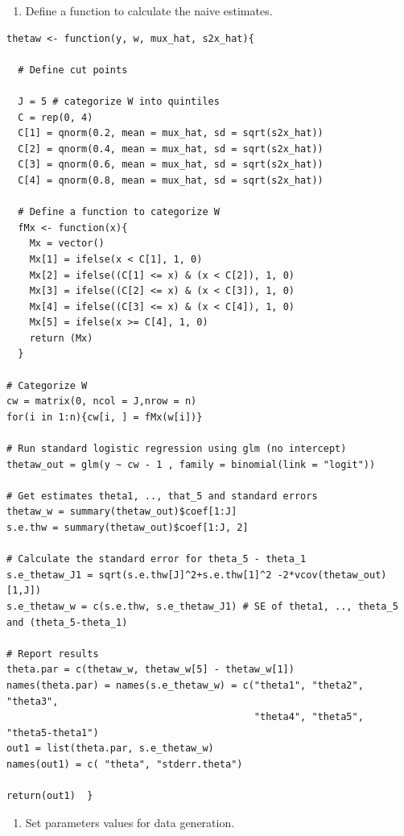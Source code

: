 \documentclass[15 pt,]{article}
\providecommand{\tightlist}{%
  \setlength{\itemsep}{0pt}\setlength{\parskip}{0pt}}
\begin{document}
\begin{enumerate}
\def\labelenumi{(\arabic{enumi})}
\tightlist
\item
  Define a function to calculate the naive estimates.
\end{enumerate}

\begin{verbatim}
thetaw <- function(y, w, mux_hat, s2x_hat){
  
  # Define cut points
  
  J = 5 # categorize W into quintiles
  C = rep(0, 4)
  C[1] = qnorm(0.2, mean = mux_hat, sd = sqrt(s2x_hat))
  C[2] = qnorm(0.4, mean = mux_hat, sd = sqrt(s2x_hat))
  C[3] = qnorm(0.6, mean = mux_hat, sd = sqrt(s2x_hat))
  C[4] = qnorm(0.8, mean = mux_hat, sd = sqrt(s2x_hat))
  
  # Define a function to categorize W
  fMx <- function(x){
    Mx = vector()
    Mx[1] = ifelse(x < C[1], 1, 0)
    Mx[2] = ifelse((C[1] <= x) & (x < C[2]), 1, 0)
    Mx[3] = ifelse((C[2] <= x) & (x < C[3]), 1, 0)
    Mx[4] = ifelse((C[3] <= x) & (x < C[4]), 1, 0)
    Mx[5] = ifelse(x >= C[4], 1, 0)
    return (Mx)
  }  
  
# Categorize W
cw = matrix(0, ncol = J,nrow = n)
for(i in 1:n){cw[i, ] = fMx(w[i])}

# Run standard logistic regression using glm (no intercept)
thetaw_out = glm(y ~ cw - 1 , family = binomial(link = "logit"))

# Get estimates theta1, .., that_5 and standard errors
thetaw_w = summary(thetaw_out)$coef[1:J] 
s.e.thw = summary(thetaw_out)$coef[1:J, 2]

# Calculate the standard error for theta_5 - theta_1
s.e_thetaw_J1 = sqrt(s.e.thw[J]^2+s.e.thw[1]^2 -2*vcov(thetaw_out)[1,J])
s.e_thetaw_w = c(s.e.thw, s.e_thetaw_J1) # SE of theta1, .., theta_5 and (theta_5-theta_1)

# Report results 
theta.par = c(thetaw_w, thetaw_w[5] - thetaw_w[1])
names(theta.par) = names(s.e_thetaw_w) = c("theta1", "theta2", "theta3", 
                                           "theta4", "theta5", "theta5-theta1")
out1 = list(theta.par, s.e_thetaw_w)
names(out1) = c( "theta", "stderr.theta")

return(out1)  }
\end{verbatim}

\begin{enumerate}
\def\labelenumi{(\arabic{enumi})}
\setcounter{enumi}{1}
\tightlist
\item
  Set parameters values for data generation.
\end{enumerate}
\end{document}
